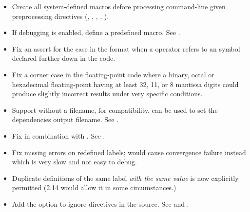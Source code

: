 \begin{itemize}
    \item{Create all system-defined macros defore processing command-line
        given preprocessing directives (, , , ,
        ).}

    \item{If debugging is enabled, define a  predefined
        macro. See .}

    \item{Fix an assert for the case in the  format when a 
        operator refers to an  symbol declared further down in the
        code.}

    \item{Fix a corner case in the floating-point code where a binary, octal
        or hexadecimal floating-point having at least 32, 11, or 8 mantissa
        digits could produce slightly incorrect results under very specific
        conditions.}

    \item{Support  without a filename, for  compatibility.
         can be used to set the dependencies output filename.
        See .}

    \item{Fix  in combination with . See .}

    \item{Fix missing errors on redefined labels; would cause convergence
        failure instead which is very slow and not easy to debug.}

    \item{Duplicate definitions of the same label \emph{with the same value} is now
        explicitly permitted (2.14 would allow it in some circumstances.)}

    \item{Add the option  to ignore  directives in the
        source. See  and .}
\end{itemize}


